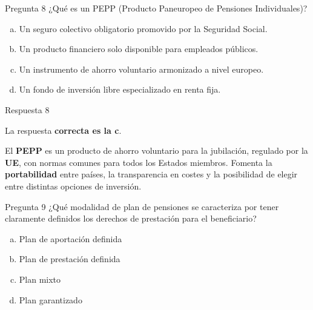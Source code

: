 \documentclass[
  ignorenonframetext,
  aspectratio=54,
  spanish,
]{beamer}
\providecommand{\tightlist}{%
  \setlength{\itemsep}{0pt}\setlength{\parskip}{0pt}}
\begin{document}
\begin{frame}{Pregunta 8}
\label{pregunta-8}
¿Qué es un PEPP (Producto Paneuropeo de Pensiones Individuales)?

\begin{enumerate}
[a.]
\tightlist
\item
  Un seguro colectivo obligatorio promovido por la Seguridad Social.
\item
  Un producto financiero solo disponible para empleados públicos.
\item
  Un instrumento de ahorro voluntario armonizado a nivel europeo.
\item
  Un fondo de inversión libre especializado en renta fija.
\end{enumerate}
\end{frame}

\begin{frame}{Respuesta 8}
\label{respuesta-8}
\begin{tcolorbox}[enhanced jigsaw, rightrule=.15mm, colback=white, arc=.35mm, colframe=quarto-callout-tip-color-frame, leftrule=.75mm, bottomrule=.15mm, left=2mm, toprule=.15mm, opacityback=0, breakable]
\begin{minipage}[t]{5.5mm}
\textcolor{quarto-callout-tip-color}{\faLightbulb}
\end{minipage}%
\begin{minipage}[t]{\textwidth - 5.5mm}

La respuesta \textbf{correcta es la c}.

El \textbf{PEPP} es un producto de ahorro voluntario para la jubilación,
regulado por la \textbf{UE}, con normas comunes para todos los Estados
miembros. Fomenta la \textbf{portabilidad} entre países, la
transparencia en costes y la posibilidad de elegir entre distintas
opciones de inversión.

\end{minipage}%
\end{tcolorbox}
\end{frame}

\begin{frame}{Pregunta 9}
\label{pregunta-9}
¿Qué modalidad de plan de pensiones se caracteriza por tener claramente
definidos los derechos de prestación para el beneficiario?

\begin{enumerate}
[a.]
\tightlist
\item
  Plan de aportación definida
\item
  Plan de prestación definida
\item
  Plan mixto
\item
  Plan garantizado
\end{enumerate}
\end{frame}
\end{document}
